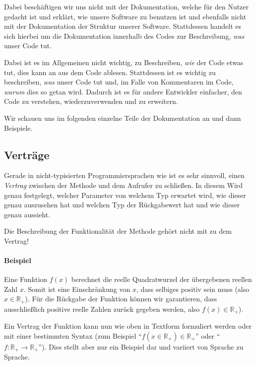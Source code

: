 
Dabei beschäftigen wir uns nicht mit der Dokumentation, welche für den Nutzer gedacht ist und erklärt, wie unsere Software zu benutzen ist und ebenfalls nicht mit der Dokumentation der Struktur unserer Software. Stattdessen handelt es sich hierbei um die Dokumentation innerhalb des Codes zur Beschreibung, \textit{was} unser Code tut.

Dabei ist es im Allgemeinen nicht wichtig, zu Beschreiben, \textit{wie} der Code etwas tut, dies kann an aus dem Code ablesen. Stattdessen ist es wichtig zu beschreiben, \textit{was} unser Code tut und, im Falle von Kommentaren im Code, \textit{warum} dies so getan wird. Dadurch ist es für andere Entwickler einfacher, den Code zu verstehen, wiederzuverwenden und zu erweitern.


Wir schauen uns im folgenden einzelne Teile der Dokumentation an und dann Beispiele.

\subsection{Verträge} \functionalMark \imperativeMark \oopMark

	Gerade in nicht-typisierten Programmiersprachen wie \racket ist es sehr sinnvoll, einen \textit{Vertrag} zwischen der Methode und dem Aufrufer zu schließen. In diesem Wird genau festgelegt, welcher Parameter von welchem Typ erwartet wird, wie dieser genau auszusehen hat und welchen Typ der Rückgabewert hat und wie dieser genau aussieht.
	
	Die Beschreibung der Funktionalität der Methode gehört nicht mit zu dem Vertrag!
	
	\paragraph{Beispiel}
		Eine Funktion \(f(x)\) berechnet die reelle Quadratwurzel der übergebenen reellen Zahl \(x\). Somit ist eine Einschränkung von \(x\), dass selbiges positiv sein muss (also \(x \in \mathbb{R} _ +\)). Für die Rückgabe der Funktion können wir garantieren, dass ausschließlich positive reelle Zahlen zurück gegeben werden, also \(f(x) \in \mathbb{R} _ +\)).
		
		Ein Vertrag der Funktion kann nun wie oben in Textform formuliert werden oder mit einer bestimmten Syntax (zum Beispiel \enquote{\( f(x \in \mathbb{R} _ +) \in \mathbb{R} _ + \)} oder \enquote{\( f : \mathbb{R} _ + \rightarrow \mathbb{R} _ + \)}). Dies stellt aber nur ein Beispiel dar und variiert von Sprache zu Sprache.


